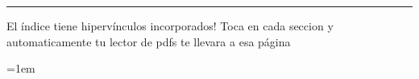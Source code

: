 \documentclass{article}
\begin{document}



\tableofcontents		\noindent\rule{\textwidth}{0.7pt }

El índice tiene hipervínculos incorporados!
Toca en cada seccion y automaticamente tu lector de pdfs te llevara a esa página








{
	\emergencystretch=1em %
	\printbibliography
}
\end{document}

